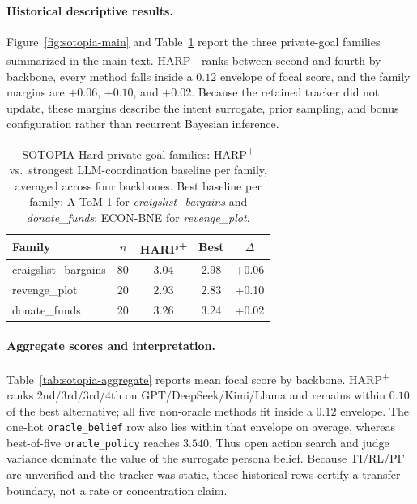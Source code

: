 \paragraph{Historical descriptive results.} Figure~\ref{fig:sotopia-main} and Table~\ref{tab:sotopia-pf-families} report the three private-goal families summarized in the main text. HARP\textsuperscript{+} ranks between second and fourth by backbone, every method falls inside a $0.12$ envelope of focal score, and the family margins are $+0.06$, $+0.10$, and $+0.02$. Because the retained tracker did not update, these margins describe the intent surrogate, prior sampling, and bonus configuration rather than recurrent Bayesian inference.

\begin{table}[h]
\centering\small
\caption{SOTOPIA-Hard private-goal families: HARP\textsuperscript{+} vs.\ strongest LLM-coordination baseline per family, averaged across four backbones. Best baseline per family: A-ToM-1 for \emph{craigslist\_bargains} and \emph{donate\_funds}; ECON-BNE for \emph{revenge\_plot}.}
\label{tab:sotopia-pf-families}
\setlength{\tabcolsep}{6pt}
\begin{tabular}{@{}lcccc@{}}
\toprule
Family & $n$ & HARP\textsuperscript{+} & Best & $\Delta$ \\
\midrule
craigslist\_bargains & 80  & 3.04 & 2.98 & +0.06 \\
revenge\_plot        & 20 & 2.93 & 2.83 & +0.10 \\
donate\_funds        & 20  & 3.26 & 3.24 & +0.02 \\
\bottomrule
\end{tabular}
\end{table}

\paragraph{Aggregate scores and interpretation.} Table~\ref{tab:sotopia-aggregate} reports mean focal score by backbone. HARP\textsuperscript{+} ranks 2nd/3rd/3rd/4th on GPT/DeepSeek/Kimi/Llama and remains within $0.10$ of the best alternative; all five non-oracle methods fit inside a $0.12$ envelope. The one-hot \texttt{oracle\_belief} row also lies within that envelope on average, whereas best-of-five \texttt{oracle\_policy} reaches $3.540$. Thus open action search and judge variance dominate the value of the surrogate persona belief. Because TI/RL/PF are unverified and the tracker was static, these historical rows certify a transfer boundary, not a rate or concentration claim.

